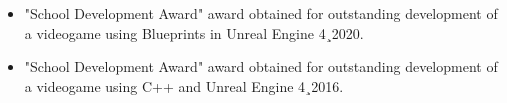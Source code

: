 \documentclass{../Styles/AndreCV-RStyle}
\begin{document}
\begin{Form}
    \begin{itemize}
        \item "School Development Award" award obtained for outstanding development of a videogame using Blueprints in Unreal Engine 4¸2020.

        \item "School Development Award" award obtained for outstanding development of a videogame using C++ and Unreal Engine 4¸2016.
    \end{itemize}

\end{Form}
\end{document}
